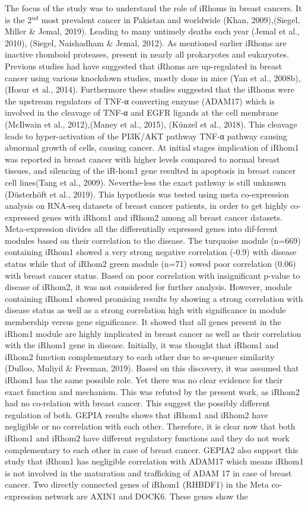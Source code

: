 \documentclass[fleqn,10pt,lineno]{wlpeerj}
\begin{document}
The focus of the study was to understand the role of iRhoms in breast cancers. It is the 2$^{nd}$ most prevalent cancer in Pakistan and worldwide (Khan, 2009),(Siegel, Miller & Jemal, 2019). Leading to many untimely deaths each year (Jemal et al., 2010), (Siegel, Naishadham & Jemal, 2012). As mentioned earlier iRhoms are inactive rhomboid proteases, present in nearly all  prokaryotes and eukaryotes. Previous studies had have suggested that iRhoms are up-regulated in breast cancer using various knockdown studies, mostly done in mice (Yan et al., 2008b),(Hosur et al., 2014). Furthermore these studies suggested that the iRhoms were the upstream regulators of TNF-α converting enzyme (ADAM17) which is involved in the cleavage of TNF-α and EGFR ligands at the cell membrane (McIlwain et al., 2012),(Maney et al., 2015), (Künzel et al., 2018). This cleavage leads to hyper-activation of the PI3K/AKT pathway TNF-α pathway causing abnormal growth of cells, causing cancer. At initial stages implication of iRhom1 was reported in breast cancer with higher levels compared to normal breast tissues, and silencing of the iR-hom1 gene resulted in apoptosis in breast cancer cell lines(Tang et al., 2009).  Neverthe-less the exact pathway is still unknown (Düsterhöft et al., 2019). This hypothesis was tested using meta co-expression analysis on RNA-seq datasets of breast cancer patients, in order to get highly co-expressed genes with iRhom1 and iRhom2 among all breast cancer datasets. Meta-expression divides all the differentially expressed genes into dif-ferent modules based on their correlation to the disease. The turquoise module (n=669) containing iRhom1 showed a very strong negative correlation (-0.9) with disease status while that of iRhom2 green module (n=71) sowed poor correlation (0.06) with breast cancer status. Based on poor correlation with insignificant p-value to disease of iRhom2, it was not considered for further analysis. However, module containing iRhom1 showed promising results by showing a strong correlation with disease status as well as a strong correlation high with significance in module membership versus gene significance. It showed that all genes present in the iRhom1 module are highly implicated in breast cancer as well as their correlation with the iRhom1 gene in disease. Initially, it was thought that iRhom1 and iRhom2 function complementary to each other due to se-quence similarity (Dulloo, Muliyil & Freeman, 2019). Based on this discovery, it was assumed that iRhom1 has the same possible role. Yet there was no clear evidence for their exact function and mechanism. This was refuted by the present work, as iRhom2 had no co-relation with breast cancer. This suggest the possibly different regulation of both. GEPIA results shows that iRhom1 and iRhom2 have negligible or no correlation with each other. Therefore, it is clear now that both iRhom1 and iRhom2 have different regulatory functions and they do not work complementary to each other in case of breast cancer.  GEPIA2 also support this study that iRhom1 has negligible correlation with ADAM17 which means iRhom1 is not involved in the maturation and trafficking of ADAM 17 in case of breast cancer. Two directly connected genes of iRhom1 (RHBDF1) in the Meta co-expression network are AXIN1 and DOCK6. These genes show the 
\end{document}

